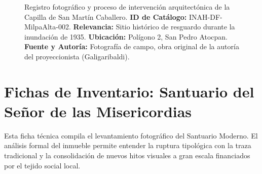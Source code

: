 \begin{figure}[p]
    \vspace{0.4cm}
    \caption{Registro fotográfico y proceso de intervención arquitectónica de la Capilla de San Martín Caballero. \textbf{ID de Catálogo:} 
    INAH-DF-MilpaAlta-002. \textbf{Relevancia:} Sitio histórico de resguardo durante la inundación de 1935. 
    \textbf{Ubicación:} Polígono 2, San Pedro Atocpan. 
    \textbf{Fuente y Autoría:} Fotografía de campo, obra original de la autoría del proyeccionista (Galigaribaldi).}
    \label{fig:cuadricula-capilla}
\end{figure}
\newpage

\newpage
\section{Fichas de Inventario: Santuario del Señor de las Misericordias}
\label{anexo:ficha-santuario}

Esta ficha técnica compila el levantamiento fotográfico del Santuario Moderno. 
El análisis formal del inmueble permite entender la ruptura tipológica con la traza tradicional 
y la consolidación de nuevos hitos visuales a gran escala financiados por el tejido social local.

